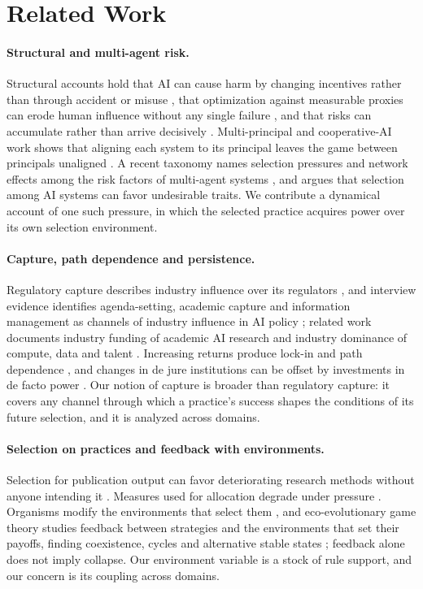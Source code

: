 \documentclass[letterpaper]{article} %
\theoremstyle{definition}
\begin{document}
\section{Related Work}\label{sec:related}

\paragraph{Structural and multi-agent risk.} Structural accounts hold that AI can cause harm by changing incentives rather than through accident or misuse \citep{zwetsloot2019}, that optimization against measurable proxies can erode human influence without any single failure \citep{christiano2019,kulveit2025}, and that risks can accumulate rather than arrive decisively \citep{kasirzadeh2025}. Multi-principal and cooperative-AI work shows that aligning each system to its principal leaves the game between principals unaligned \citep{critch2020,critch2023,dafoe2020,gabriel2020}. A recent taxonomy names selection pressures and network effects among the risk factors of multi-agent systems \citep{hammond2025}, and \citet{hendrycks2023} argues that selection among AI systems can favor undesirable traits. We contribute a dynamical account of one such pressure, in which the selected practice acquires power over its own selection environment.

\paragraph{Capture, path dependence and persistence.} Regulatory capture describes industry influence over its regulators \citep{stigler1971,dalbo2006,carpenter2013}, and interview evidence identifies agenda-setting, academic capture and information management as channels of industry influence in AI policy \citep{wei2024}; related work documents industry funding of academic AI research \citep{abdalla2021,whittaker2021} and industry dominance of compute, data and talent \citep{ahmed2023}. Increasing returns produce lock-in and path dependence \citep{arthur1989,pierson2000}, and changes in de jure institutions can be offset by investments in de facto power \citep{acemoglu2008}. Our notion of capture is broader than regulatory capture: it covers any channel through which a practice's success shapes the conditions of its future selection, and it is analyzed across domains.

\paragraph{Selection on practices and feedback with environments.} Selection for publication output can favor deteriorating research methods without anyone intending it \citep{smaldino2016}. Measures used for allocation degrade under pressure \citep{campbell1979,manheim2018}. Organisms modify the environments that select them \citep{odlingsmee2003}, and eco-evolutionary game theory studies feedback between strategies and the environments that set their payoffs, finding coexistence, cycles and alternative stable states \citep{weitz2016,tilman2020}; feedback alone does not imply collapse. Our environment variable is a stock of rule support, and our concern is its coupling across domains.
\end{document}
